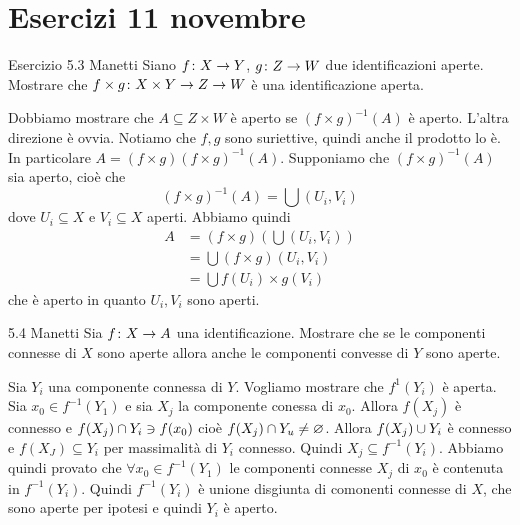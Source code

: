 \documentclass[a4paper]{article}
\begin{document}

\section{Esercizi 11 novembre}

\begin{snippetexercise}{Esercizio 5.3 Manetti}
    Siano \(f \colon X \to Y\), \(g \colon Z \to W\)
    due identificazioni aperte. Mostrare che
    \(f\times g \colon X \times Y \to Z \to W\) è una identificazione aperta.
\end{snippetexercise}

\begin{snippetsolution}{}
    Dobbiamo mostrare che \(A \subseteq Z \times W\) è aperto se
    \((f\times g)^{-1}(A)\) è aperto. L'altra direzione è ovvia.
    Notiamo che \(f,g\) sono suriettive, quindi anche il prodotto lo è.
    In particolare \(A = (f\times g)({f\times g})^{-1}(A)\).
    Supponiamo che \((f\times g)^{-1}(A)\) sia aperto, cioè
    che
    \[
        (f\times g)^{-1}(A) = \bigcup (U_i, V_i)
    \]
    dove \(U_i \subseteq X\) e \(V_i \subseteq X\) aperti.
    Abbiamo quindi \begin{align*}
        A &= (f\times g)(\bigcup (U_i, V_i)) \\
        &= \bigcup (f\times g)(U_i, V_i) \\
        &= \bigcup f(U_i) \times g(V_i)
    \end{align*}
    che è aperto in quanto \(U_i, V_i\) sono aperti.
\end{snippetsolution}

\begin{snippetexercise}{5.4 Manetti}
    Sia \(f\colon X \to A\) una identificazione.
    Mostrare che se le componenti connesse di \(X\)
    sono aperte allora anche le componenti
    convesse di \(Y\) sono aperte. 
\end{snippetexercise}

\begin{snippetsolution}{}
    Sia \(Y_i\) una componente connessa di \(Y\).
    Vogliamo mostrare che \(f^{1}(Y_i)\) è aperta.
    Sia \(x_0 \in f^{-1}(Y_1)\) e sia \(X_j\) la componente conessa di \(x_0\).
    Allora \(f(X_j)\) è connesso e \(f(X_j) \cap Y_i \ni f(x_0)\)
    cioè \(f(X_j) \cap Y_u \neq \varnothing\).
    Allora \(f(X_j) \cup Y_i\) è connesso e \(f(X_J) \subseteq Y_i\)
    per massimalità di \(Y_i\) connesso.
    Quindi \(X_j \subseteq f^{-1}(Y_i)\). Abbiamo quindi provato che
    \(\forall x_0 \in f^{-1}(Y_1)\) le componenti connesse \(X_j\)
    di \(x_0\) è contenuta in \(f^{-1}(Y_i)\).
    Quindi \(f^{-1}(Y_i)\) è unione disgiunta di comonenti connesse di \(X\),
    che sono aperte per ipotesi e quindi \(Y_i\) è aperto.
\end{snippetsolution}
\end{document}
